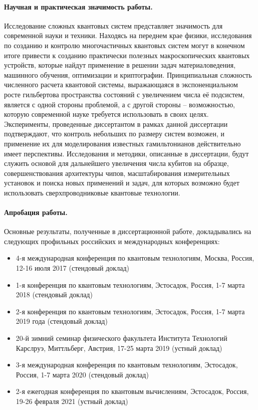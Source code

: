 \documentclass[14pt, a4paper]{extarticle}
\begin{document}
\paragraph{Научная и практическая значимость работы.} Исследование сложных квантовых систем представляет значимость для современной науки и техники. Находясь на переднем крае физики, исследования по созданию и контролю многочастичных квантовых систем могут в конечном итоге привести к созданию практически полезных макроскопических квантовых устройств, которые найдут применение в решении задач материаловедения, машинного обучения, оптимизации и криптографии. Принципиальная сложность численного расчета квантовой системы, выражающаяся в экспоненциальном росте гильбертова пространства состояний с увеличением числа её подсистем, является с одной стороны проблемой, а с другой стороны -- возможностью, которую современной науке требуется использовать в своих целях. Эксперименты, проведенные диссертантом в рамках данной диссертации подтверждают, что контроль небольших по размеру систем возможен, и применение их для моделирования известных гамильтонианов действительно имеет перспективы. Исследования и методики, описанные в диссертации, будут служить основой для дальнейшего увеличения числа кубитов на образце, совершенствования архитектуры чипов, масштабирования измерительных установок и поиска новых применений и задач, для которых возможно будет использовать сверхпроводниковые квантовые технологии.


\paragraph{Апробация работы.} Основные результаты, полученные в диссертационной работе, докладывались на следующих профильных российских и международных конференциях:
\begin{itemize}
	\item 4-я международная конференция по квантовым технологиям, Москва, Россия, 12-16 июля 2017 (стендовый доклад)
	\item 1-я конференция по квантовым технологиям, Эстосадок, Россия, 1-7 марта 2018 (стендовый доклад)
	\item 2-я конференция по квантовым технологиям, Эстосадок, Россия, 1-7 марта 2019 года (стендовый доклад)
	\item 20-й зимний семинар физического факультета Института Технологий Карслруэ, Миттльберг, Австрия,  17-25 марта 2019 (устный доклад)
	\item 3-я международная конференция по квантовым технологиям, Эстосадок, Россия, 1-7 марта 2020 (стендовый доклад)
	\item 2-я ежегодная конференция по квантовым вычислениям, Эстосадок, Россия, 19-26 февраля 2021 (устный доклад)
\end{itemize}
\end{document}
